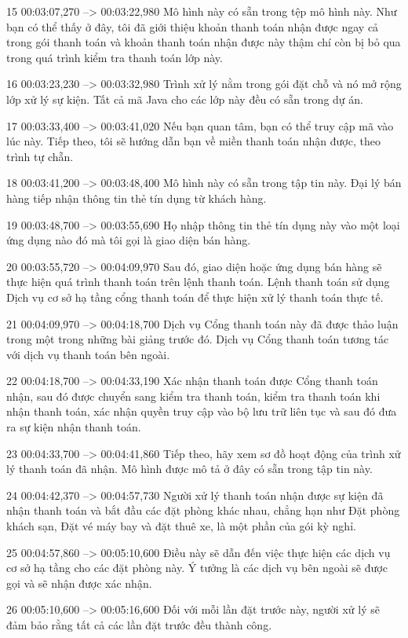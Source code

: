 15
00:03:07,270 --> 00:03:22,980
Mô hình này có sẵn trong tệp mô hình này.  Như bạn có thể thấy ở đây, tôi đã giới thiệu khoản thanh toán nhận được ngay cả trong gói thanh toán và khoản thanh toán nhận được này thậm chí còn bị bỏ qua trong quá trình kiểm tra thanh toán lớp này.

16
00:03:23,230 --> 00:03:32,980
Trình xử lý nằm trong gói đặt chỗ và nó mở rộng lớp xử lý sự kiện.  Tất cả mã Java cho các lớp này đều có sẵn trong dự án.

17
00:03:33,400 --> 00:03:41,020
Nếu bạn quan tâm, bạn có thể truy cập mã vào lúc này.  Tiếp theo, tôi sẽ hướng dẫn bạn về miền thanh toán nhận được, theo trình tự chẵn.

18
00:03:41,200 --> 00:03:48,400
Mô hình này có sẵn trong tập tin này.  Đại lý bán hàng tiếp nhận thông tin thẻ tín dụng từ khách hàng.

19
00:03:48,700 --> 00:03:55,690
Họ nhập thông tin thẻ tín dụng này vào một loại ứng dụng nào đó mà tôi gọi là giao diện bán hàng.

20
00:03:55,720 --> 00:04:09,970
Sau đó, giao diện hoặc ứng dụng bán hàng sẽ thực hiện quá trình thanh toán trên lệnh thanh toán.  Lệnh thanh toán sử dụng Dịch vụ cơ sở hạ tầng cổng thanh toán để thực hiện xử lý thanh toán thực tế.

21
00:04:09,970 --> 00:04:18,700
Dịch vụ Cổng thanh toán này đã được thảo luận trong một trong những bài giảng trước đó.  Dịch vụ Cổng thanh toán tương tác với dịch vụ thanh toán bên ngoài.

22
00:04:18,700 --> 00:04:33,190
Xác nhận thanh toán được Cổng thanh toán nhận, sau đó được chuyển sang kiểm tra thanh toán, kiểm tra thanh toán khi nhận thanh toán, xác nhận quyền truy cập vào bộ lưu trữ liên tục và sau đó đưa ra sự kiện nhận thanh toán.

23
00:04:33,700 --> 00:04:41,860
Tiếp theo, hãy xem sơ đồ hoạt động của trình xử lý thanh toán đã nhận.  Mô hình được mô tả ở đây có sẵn trong tập tin này.

24
00:04:42,370 --> 00:04:57,730
Người xử lý thanh toán nhận được sự kiện đã nhận thanh toán và bắt đầu các đặt phòng khác nhau, chẳng hạn như Đặt phòng khách sạn, Đặt vé máy bay và đặt thuê xe, là một phần của gói kỳ nghỉ.

25
00:04:57,860 --> 00:05:10,600
Điều này sẽ dẫn đến việc thực hiện các dịch vụ cơ sở hạ tầng cho các đặt phòng này.  Ý tưởng là các dịch vụ bên ngoài sẽ được gọi và sẽ nhận được xác nhận.

26
00:05:10,600 --> 00:05:16,600
Đối với mỗi lần đặt trước này, người xử lý sẽ đảm bảo rằng tất cả các lần đặt trước đều thành công.

